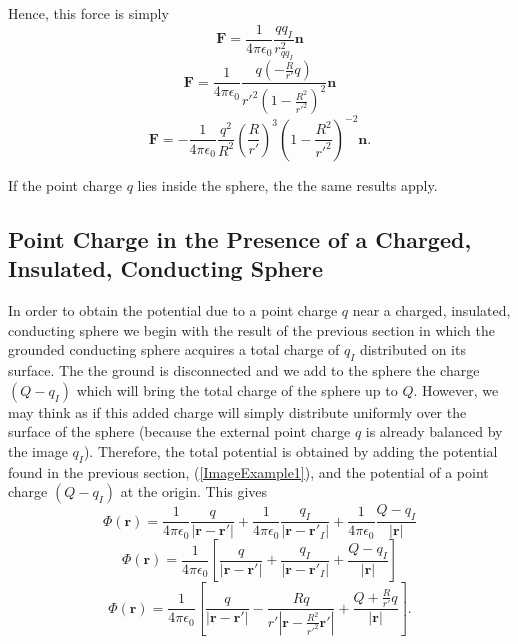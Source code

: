 Hence, this force is simply
\begin{equation}
\textbf{F} = \frac{1}{4\pi \epsilon_0} \frac{qq_I}{r_{qq_I}^2} \textbf{n}
\end{equation}
\begin{equation}
\textbf{F} = \frac{1}{4\pi \epsilon_0} \frac{q \left( -\frac{R}{r'} q \right)}{r'^2 \left( 1 - \frac{R^2}{r'^2}\right)^2} \textbf{n}
\end{equation}
\begin{equation}
\textbf{F} = - \frac{1}{4\pi \epsilon_0} \frac{q^2}{R^2}  \left( \frac{R}{r'}  \right)^3 \left( 1 - \frac{R^2}{r'^2}\right)^{-2} \textbf{n}.\label{ForceImage1}
\end{equation}

If the point charge $q$ lies inside the sphere, the the same results apply.

\subsection{ Point Charge in the Presence of a Charged, Insulated, Conducting Sphere}

In order to obtain the potential due to a point charge $q$ near a charged, insulated, conducting sphere we begin with the result of the previous section in which the grounded conducting sphere acquires a total charge of $q_I$ distributed on its surface. The the ground is disconnected and we add to the sphere the charge $(Q-q_I)$ which will bring the total charge of the sphere up to $Q$. However, we may think as if this added charge will simply distribute uniformly over the surface of the sphere (because the external point charge $q$ is already balanced by the image $q_I$). Therefore,  the total potential is obtained by adding the potential found in the previous section, (\ref{ImageExample1}), and the potential of a point charge $(Q-q_I)$ at the origin. This gives
\begin{equation}
\Phi (\textbf{r}) = \frac{1}{4\pi \epsilon_0} \frac{q}{\left| \textbf{r} - \textbf{r}' \right|} + \frac{1}{4\pi \epsilon_0} \frac{q_I}{\left| \textbf{r} - \textbf{r}'_I \right|} +  \frac{1}{4\pi \epsilon_0} \frac{Q-q_I}{\left| \textbf{r} \right|}
\end{equation}
\begin{equation}
\Phi (\textbf{r}) = \frac{1}{4\pi \epsilon_0} \left[ \frac{q}{\left| \textbf{r} - \textbf{r}' \right|} +  \frac{q_I}{\left| \textbf{r} - \textbf{r}'_I \right|} +   \frac{Q-q_I}{\left| \textbf{r} \right|} \right]
\end{equation}
\begin{equation}
\Phi (\textbf{r}) = \frac{1}{4\pi \epsilon_0} \left[ \frac{q}{\left| \textbf{r} - \textbf{r}' \right|} -  \frac{R q}{r' \left| \textbf{r} - \frac{R^2}{r'^2}\textbf{r}' \right|} +   \frac{Q+\frac{R}{r'}q}{\left| \textbf{r} \right|} \right].
\end{equation}

